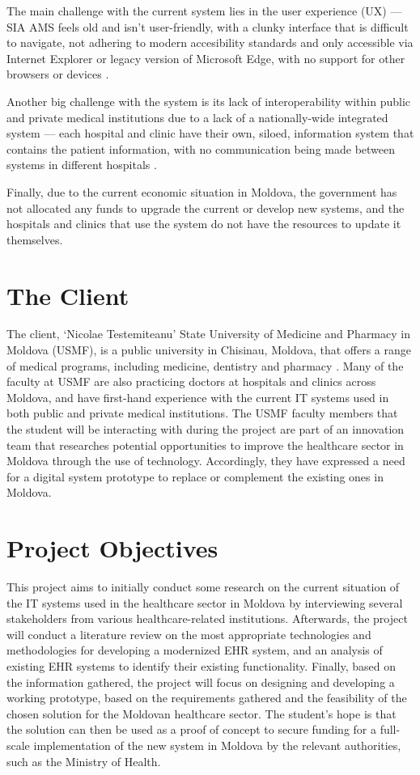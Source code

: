The main challenge with the current system lies in the user experience (UX) --- SIA AMS feels old and isn't user-friendly, with a clunky interface that is difficult to navigate, not adhering to modern accesibility standards and only accessible via Internet Explorer or legacy version of Microsoft Edge, with no support for other browsers or devices \parencite{mdehr}. 

Another big challenge with the system is its lack of interoperability within public and private medical institutions due to a lack of a nationally-wide integrated system --- each hospital and clinic have their own, siloed, information system that contains the patient information, with no communication being made between systems in different hospitals \parencite{mdehr}. 

Finally, due to the current economic situation in Moldova, the government has not allocated any funds to upgrade the current or develop new systems, and the hospitals and clinics that use the system do not have the resources to update it themselves.

\section{The Client}

The client, `Nicolae Testemiteanu' State University of Medicine and Pharmacy in Moldova (USMF), is a public university in Chisinau, Moldova, that offers a range of medical programs, including medicine, dentistry and pharmacy \parencite{mduni}. Many of the faculty at USMF are also practicing doctors at hospitals and clinics across Moldova, and have first-hand experience with the current IT systems used in both public and private medical institutions. The USMF faculty members that the student will be interacting with during the project are part of an innovation team that researches potential opportunities to improve the healthcare sector in Moldova through the use of technology. Accordingly, they have expressed a need for a digital system prototype to replace or complement the existing ones in Moldova.

\section{Project Objectives}

This project aims to initially conduct some research on the current situation of the IT systems used in the healthcare sector in Moldova by interviewing several stakeholders from various healthcare-related institutions. Afterwards, the project will conduct a literature review on the most appropriate technologies and methodologies for developing a modernized EHR system, and an analysis of existing EHR systems to identify their existing functionality. Finally, based on the information gathered, the project will focus on designing and developing a working prototype, based on the requirements gathered and the feasibility of the chosen solution for the Moldovan healthcare sector. The student's hope is that the solution can then be used as a proof of concept to secure funding for a full-scale implementation of the new system in Moldova by the relevant authorities, such as the Ministry of Health.

